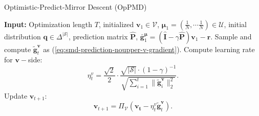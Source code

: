 \documentclass[12pt]{article}
\begin{document}
\begin{algorithm}[htb]
	\caption{Optimistic-Predict-Mirror Descent (OpPMD)}
	\begin{algorithmic}[1]
	    \State \textbf{Input:} Optimization length $T$, initialized $\boldsymbol{v}_1 \in \mathcal{V}$, $\boldsymbol{\mu}_1 = (\frac{1}{N},\cdots \frac{1}{N}) \in \mathcal{U}$, initial distribution $\boldsymbol{q}  \in \Delta^{|\mathcal{S}|}$, prediction matrix $\hat{\boldsymbol{\text{P}}}$, $\bar{\boldsymbol{g}}_{1}^{\boldsymbol{\mu}} = (\hat{\boldsymbol{\text{I}}} - \gamma \hat{\boldsymbol{\text{P}}}) \boldsymbol{v}_{1} - \boldsymbol{\text{r}}$.
       \State Sample and compute $\tilde{\boldsymbol{g}}^{\boldsymbol{v}}_t$ as (\ref{eq:smd-prediction-noupper-v-gradient}).
       \State Compute learning rate for $\boldsymbol{v}-$side:
       \begin{equation}
           \eta_t^v = \frac{\sqrt{2}}{2} \cdot \frac{\sqrt{|\mathcal{S}|} \cdot (1-\gamma)^{-1}}{\sqrt{\sum_{i=1}^t \|\tilde{\boldsymbol{g}}^{\boldsymbol{v}}_i\|_2^2}}.
           \label{eq:smd-prediction-noupper-v-learning-rate}
       \end{equation}
       \State Update $\boldsymbol{v}_{t+1}$: 
       \begin{equation}
           \boldsymbol{v}_{t+1}  = \Pi_{\mathcal{V}} (\boldsymbol{v_t} - \eta_t^v\tilde{\boldsymbol{g}}^{\boldsymbol{v}}_t).
           \label{eq:smd-prediction-noupper-v-update}
       \end{equation}

\end{algorithmic}
\end{algorithm}
\end{document}
